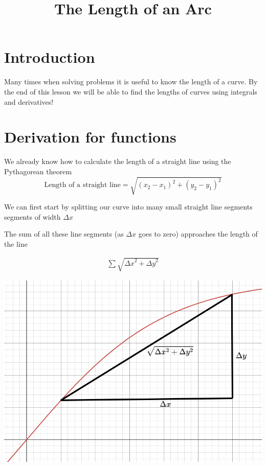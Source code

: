 \documentclass[12pt]{extarticle}
\title{The Length of an Arc}
\makeatletter
\renewcommand{\maketitle}{
  \begin{center}
    {\Huge \@title}
    \vspace{0cm} %
  \end{center}
}
\makeatother
\begin{document}
\thispagestyle{empty}
\maketitle



\hrulefill

\section{Introduction}
Many times when solving problems it is useful to know the length of a curve. By the end of this lesson we will be able to find the lengths of curves using integrals and derivatives!

\section{Derivation for functions}

We already know how to calculate the length of a straight line using the Pythagorean theorem
\begin{equation}
    \text{Length of a straight line} = \sqrt{(x_2 - x_1)^2 + (y_2 - y_1)^2}
\end{equation}

We can first start by splitting our curve into many small straight line segments segments of width $\Delta x$

The sum of all these line segments (as $\Delta x$ goes to zero) approaches the length of the line 

\begin{align}
    \sum \sqrt{{\Delta x}^2 + {\Delta y}^2}
\end{align}

\begin{center}
    \includegraphics[height = 0.4\textheight]{proofImage1.png}
\end{center}
\end{document}
